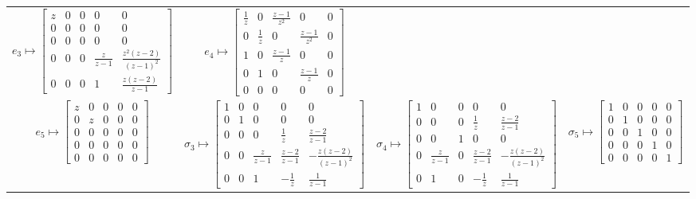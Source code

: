 \documentclass[11pt,a4paper,reqno,svgnames]{amsart}
\theoremstyle{plain}
\theoremstyle{definition}
\numberwithin{equation}{section}
\begin{document}
\begin{landscape}
\begin{table}[hhh]
\begin{tabular}{cccc}
 ${e}_{3}\mapsto
 \begin{bmatrix}z&0&0&0&0
 \\0&0&0&0&0
 \\0&0&0&0&0
 \\0&0&0&\frac{z}{z-1}&\frac{z^2(z-2)}{(z-1)^2}
 \\0&0&0&1&\frac{z(z-2)}{z-1}
 \end{bmatrix}$ &  ${e}_{4}\mapsto\begin{bmatrix}\frac{1}{z}&0&\frac{z-1}{z^2}&0&0\\0&\frac{1}{z}&0&\frac{z-1}{z^2}&0\\1&0&\frac{z-1}{z}&0&0\\0&1&0&\frac{z-1}{z}&0\\0&0&0&0&0\end{bmatrix}$
 \medskip 
 \\
 ${e}_{5}\mapsto\begin{bmatrix}z&0&0&0&0\\0&z&0&0&0\\ 0&0&0&0&0\\0&0&0&0&0\\0&0&0&0&0\end{bmatrix}$ &
 ${\sigma}_{3}\mapsto
 \begin{bmatrix}1&0&0&0&0
 \\0&1&0&0&0\\
 0&0&0&\frac{1}{z}&\frac{z-2}{z-1}\\
 0&0&\frac{z}{z-1}&\frac{z-2}{z-1}&-\frac{z(z-2)}{(z-1)^2}\\
 0&0&1&-\frac{1}{z}&\frac{1}{z-1}\end{bmatrix}$ &
 ${\sigma}_{4}\mapsto
 \begin{bmatrix}1&0&0&0&0\\0&0&0&\frac{1}{z}&\frac{z-2}{z-1}\\0&0&1&0&0\\
 0&\frac{z}{z-1}&0&\frac{z-2}{z-1}&-\frac{z(z-2)}{(z-1)^2}\\0&1&0&-\frac{1}{z}&\frac{1}{z-1}\end{bmatrix}$ 
 & 
 ${\sigma}_{5}\mapsto\begin{bmatrix}1&0&0&0&0\\0&1&0&0&0\\0&0&1&0&0\\0&0&0&1&0\\0&0&0&0&1\end{bmatrix}$\medskip\\ 
 \bottomrule
\end{tabular}
\end{table}
\vfill 
\end{landscape}
\end{document}
